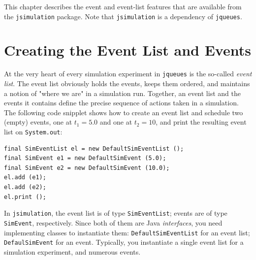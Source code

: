 \documentclass[12pt]{book}
\begin{document}
This chapter describes the event and event-list features
  that are available from the \lstinline{jsimulation} package.
Note that \lstinline{jsimulation} is a dependency of \lstinline{jqueues}.

\section{Creating the Event List and Events}

At the very heart of every simulation experiment
  in \lstinline{jqueues}
  is the so-called {\em event list}.
The event list obviously holds the events,
  keeps them ordered,
  and maintains a notion of "where we are" in a simulation run.
Together, an event list and the events it contains define
  the precise sequence of actions taken in a simulation.
The following code snipplet shows how to create an event list and
  schedule two (empty) events, one at $t_{1}=5.0$ and one at $t_{2}=10$,
  and print the resulting event list on \lstinline{System.out}:
\begin{lstlisting}
final SimEventList el = new DefaultSimEventList ();
final SimEvent e1 = new DefaultSimEvent (5.0);
final SimEvent e2 = new DefaultSimEvent (10.0);
el.add (e1);
el.add (e2);
el.print ();
\end{lstlisting}
In \lstinline{jsimulation},
  the event list is of type \lstinline{SimEventList};
  events are of type \lstinline{SimEvent},
  respectively.
Since both of them are Java {\em interfaces}, you need implementing classes
  to instantiate them: \lstinline{DefaultSimEventList} for an event list;
  \lstinline{DefaulSimEvent} for an event.
Typically,
  you instantiate a single event list for a simulation experiment,
  and numerous events.
\end{document}
